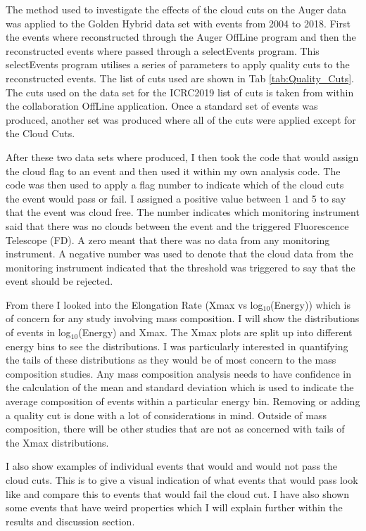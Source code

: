 The method used to investigate the effects of the cloud cuts on the Auger data was applied to the Golden Hybrid data set with events from 2004 to 2018. First the events where reconstructed through the Auger OffLine program and then the reconstructed events where passed through a selectEvents program. This selectEvents program utilises a series of parameters to apply quality cuts to the reconstructed events. The list of cuts used are shown in Tab \ref{tab:Quality_Cuts}. The cuts used on the data set for the ICRC2019 list of cuts is taken from within the collaboration OffLine application. Once a standard set of events was produced, another set was produced where all of the cuts were applied except for the Cloud Cuts. 

After these two data sets where produced, I then took the code that would assign the cloud flag to an event and then used it within my own analysis code. The code was then used to apply a flag number to indicate which of the cloud cuts the event would pass or fail. I assigned a positive value between 1 and 5 to say that the event was cloud free. The number indicates which monitoring instrument said that there was no clouds between the event and the triggered Fluorescence Telescope (FD). A zero meant that there was no data from any monitoring instrument. A negative number was used to denote that the cloud data from the monitoring instrument indicated that the threshold was triggered to say that the event should be rejected. 

From there I looked into the Elongation Rate (Xmax vs log$_{10}$(Energy)) which is of concern for any study involving mass composition. I will show the distributions of events in log$_{10}$(Energy) and Xmax. The Xmax plots are split up into different energy bins to see the distributions. I was particularly interested in quantifying the tails of these distributions as they would be of most concern to the mass composition studies. Any mass composition analysis needs to have confidence in the calculation of the mean and standard deviation which is used to indicate the average composition of events within a particular energy bin. Removing or adding a quality cut is done with a lot of considerations in mind. Outside of mass composition, there will be other studies that are not as concerned with tails of the Xmax distributions.

I also show examples of individual events that would and would not pass the cloud cuts. This is to give a visual indication of what events that would pass look like and compare this to events that would fail the cloud cut. I have also shown some events that have weird properties which I will explain further within the results and discussion section.


